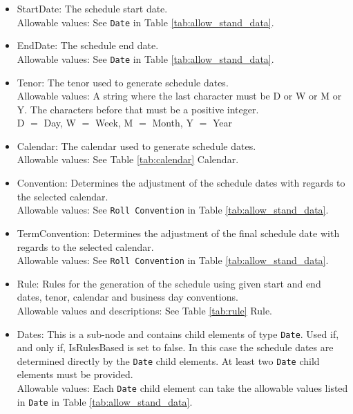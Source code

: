 \begin{itemize}
\item StartDate:  The schedule start date.  \\ Allowable values:  See \lstinline!Date! in Table \ref{tab:allow_stand_data}.
\item EndDate: The schedule end date.  \\ Allowable values:  See \lstinline!Date! in Table \ref{tab:allow_stand_data}.
\item Tenor: The tenor used to generate schedule dates. \\Allowable values: A string where the last character must be D or W or M or Y.  The characters before that must be a positive integer. \\D $=$ Day, W $=$ Week, M $=$ Month, Y $=$ Year
\item Calendar: The calendar used to generate schedule  dates. \\Allowable values: See Table \ref{tab:calendar} Calendar.

\item Convention: Determines the adjustment of the schedule dates with regards to the selected calendar. \\Allowable values: See \lstinline!Roll Convention! in Table \ref{tab:allow_stand_data}.
\item TermConvention: Determines the adjustment of the final schedule date with regards to the selected calendar. \\Allowable values: See \lstinline!Roll Convention! in Table \ref{tab:allow_stand_data}.
\item Rule: Rules for the generation of the schedule using given start and end dates, tenor, calendar and business day conventions. \\Allowable values and descriptions: See Table \ref{tab:rule} Rule.
\item Dates: This is a sub-node and contains child elements of type \lstinline!Date!. Used if, and only if, IsRulesBased is set to false. In this case the schedule dates are determined directly by the \lstinline!Date! child elements.  At least two \lstinline!Date! child elements must be provided.     \\Allowable values:  Each \lstinline!Date!  child element can take the allowable values listed in \lstinline!Date! in Table \ref{tab:allow_stand_data}.
\end{itemize}



